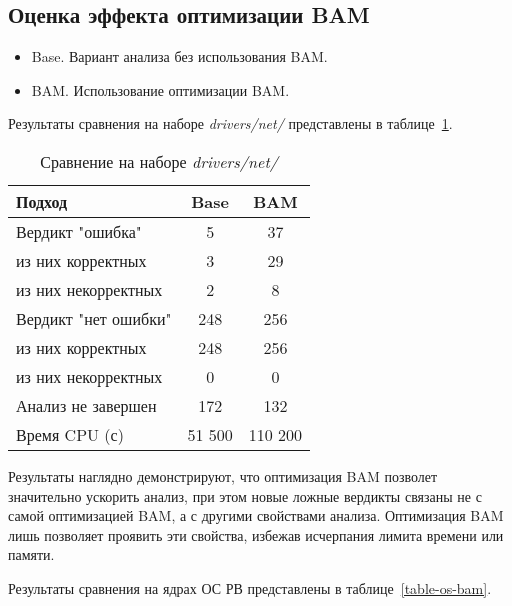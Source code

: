 \subsection{Оценка эффекта оптимизации BAM}

\begin{itemize}
\item Base. Вариант анализа без использования BAM.
\item BAM. Использование оптимизации BAM.
\end{itemize}

Результаты сравнения на наборе \textit{drivers/net/} представлены в таблице~\ref{table-drivers-bam}.

  \begin{table}[h]\footnotesize \centering
    \caption{Сравнение на наборе \textit{drivers/net/}}
  	\label{table-drivers-bam}
    \begin{tabular}{ | l | c | c | }
      \hline
      Подход         				& Base  	& BAM 	\\ \hline
      Вердикт "ошибка" 				& 5   		& 37    \\ 
  \hspace{0.5cm} из них корректных 	& 3 		& 29 	\\ 
  \hspace{0.5cm} из них некорректных & 2		& 8 	\\ \hline
      Вердикт "нет ошибки"  		& 248    	& 256    \\ 
  \hspace{0.5cm} из них корректных 	& 248 		& 256    \\
  \hspace{0.5cm} из них некорректных & 0 		& 0    	\\ \hline
      Анализ не завершен       		& 172    	& 132    \\ \hline
      Время CPU (с)   				& 51 500 	& 110 200 \\ 
      \hline
    \end{tabular}
  \end{table}

Результаты наглядно демонстрируют, что оптимизация BAM позволет значительно ускорить анализ, при этом новые ложные вердикты связаны не с самой оптимизацией BAM, а с другими свойствами анализа.
Оптимизация BAM лишь позволяет проявить эти свойства, избежав исчерпания лимита времени или памяти.

Результаты сравнения на ядрах ОС РВ представлены в таблице~\ref{table-os-bam}.

